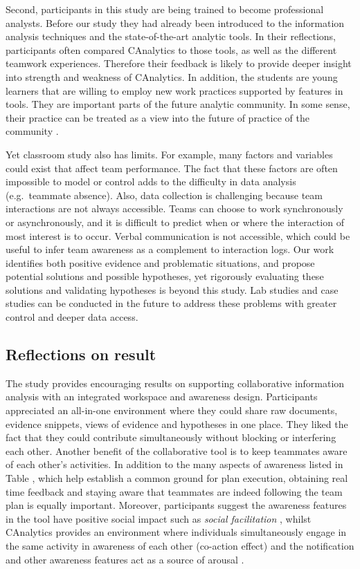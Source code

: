 Second, participants in this study are being trained to become
professional analysts. Before our study they had already been introduced
to the information analysis techniques and the state-of-the-art analytic
tools. In their reflections, participants often compared CAnalytics to
those tools, as well as the different teamwork experiences. Therefore
their feedback is likely to provide deeper insight into strength and
weakness of CAnalytics. In addition, the students are young learners
that are willing to employ new work practices supported by features in
tools. They are important parts of the future analytic community. In
some sense, their practice can be treated as a view into the future of
practice of the community \autocite{Olson2017}.

Yet classroom study also has limits. For example, many factors and
variables could exist that affect team performance. The fact that these
factors are often impossible to model or control adds to the difficulty
in data analysis (e.g.~teammate absence). Also, data collection is
challenging because team interactions are not always accessible. Teams
can choose to work synchronously or asynchronously, and it is difficult
to predict when or where the interaction of most interest is to occur.
Verbal communication is not accessible, which could be useful to infer
team awareness as a complement to interaction logs. Our work identifies
both positive evidence and problematic situations, and propose potential
solutions and possible hypotheses, yet rigorously evaluating these
solutions and validating hypotheses is beyond this study. Lab studies
and case studies can be conducted in the future to address these
problems with greater control and deeper data access.

\subsection{Reflections on result}\label{reflections-on-result}

The study provides encouraging results on supporting collaborative
information analysis with an integrated workspace and awareness design.
Participants appreciated an all-in-one environment where they could
share raw documents, evidence snippets, views of evidence and hypotheses
in one place. They liked the fact that they could contribute
simultaneously without blocking or interfering each other. Another
benefit of the collaborative tool is to keep teammates aware of each
other's activities. In addition to the many aspects of awareness listed
in Table \autocite{tab:awareness}, which help establish a common ground
for plan execution, obtaining real time feedback and staying aware that
teammates are indeed following the team plan is equally important.
Moreover, participants suggest the awareness features in the tool have
positive social impact such as \emph{social facilitation} , whilst
CAnalytics provides an environment where individuals simultaneously
engage in the same activity in awareness of each other (co-action
effect) and the notification and other awareness features act as a
source of arousal \autocite{Zajonc1965}.

